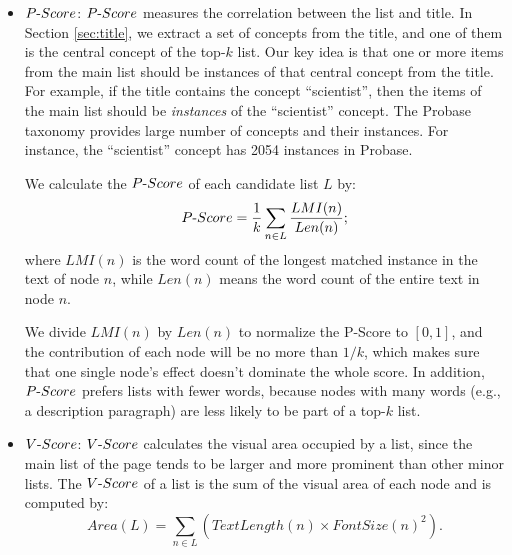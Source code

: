\begin{itemize}
\item \textbf{$P\textnormal{-}Score$}: $P\textnormal{-}Score$ measures
  the correlation between the list and title.  In Section
  \ref{sec:title}, we extract a set of concepts from the title, and
  one of them is the central concept of the top-$k$ list.
  Our key idea is that one or more items from the main list should be
  instances of that central concept from the title. For
  example, if the title contains the concept ``scientist'', then the
  items of the main list should be {\em instances} of the
  ``scientist'' concept. The Probase taxonomy provides large number of
  concepts and their instances. 
  For instance, the ``scientist'' concept has 2054 instances
  in Probase.

  We calculate the $P\textnormal{-}Score$ of each candidate list $L$
  by:
\begin{equation*}\label{equ:pScore}
  P\textnormal{-}Score= \frac{1}{k} \sum_{n \in L} \frac{LMI(n)}{Len(n)};
\end{equation*}
where $LMI(n)$ is the word count of the longest matched
instance in the text of node $n$,
while $Len(n)$ means the word count of the entire text in node $n$.

We divide $LMI(n)$ by $Len(n)$ to normalize the P-Score to $[0,1]$, and
the contribution of each node will be no more than $1/k$,
which makes sure that one single node's effect doesn't dominate the whole
score. In addition, $P\textnormal{-}Score$ prefers lists
with fewer words, because nodes with many words (e.g., a description paragraph)
are less likely to be part of a top-$k$ list.

\item \textbf{$V\textnormal{-}Score$}: $V\textnormal{-}Score$
  calculates the visual area occupied by a list, since
  the main list of the page tends to be larger and more
  prominent than other minor lists.  The $V\textnormal{-}Score$ of a
  list is the sum of the visual area of each node and is computed by:
\begin{equation*}\label{equ:vScore}
Area(L)= \sum_{n \in L} (TextLength(n)\times FontSize(n)^2).
\end{equation*}

%
%
\end{itemize}


